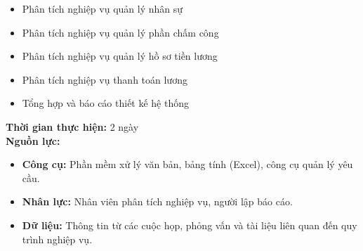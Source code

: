 {\begin{minipage}{\textwidth}
\begin{itemize}
        \begin{itemize}
            \item Phân tích nghiệp vụ quản lý nhân sự
            \item Phân tích nghiệp vụ quản lý phần chấm công
            \item Phân tích nghiệp vụ quản lý hồ sơ tiền lương
            \item Phân tích nghiệp vụ thanh toán lương
            \item Tổng hợp và báo cáo thiết kế hệ thống
        \end{itemize}
    \end{itemize}
    \noindent \textbf{Thời gian thực hiện:} 2 ngày \\
    \noindent \textbf{Nguồn lực:}
    \begin{itemize}
        \item \textbf{Công cụ:} Phần mềm xử lý văn bản, bảng tính (Excel), công cụ quản lý yêu cầu.
        \item \textbf{Nhân lực:} Nhân viên phân tích nghiệp vụ, người lập báo cáo.
        \item \textbf{Dữ liệu:} Thông tin từ các cuộc họp, phỏng vấn và tài liệu liên quan đến quy trình nghiệp vụ.
    \end{itemize}
    \end{minipage}
}
\newpage %
